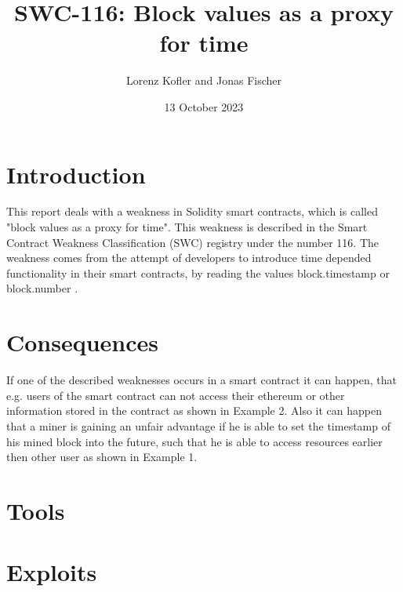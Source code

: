 \documentclass{article}
\title{SWC-116: Block values as a proxy for time}
\author{Lorenz Kofler and Jonas Fischer}
\date{13 October 2023}
\begin{document}
\maketitle
\tableofcontents
\newpage

\section{Introduction}
This report deals with a weakness in Solidity smart contracts, which is called
"block values as a proxy for time". This weakness is described in the Smart
Contract Weakness Classification (SWC) registry under the number 116. \newline
The weakness comes from the attempt of developers to introduce time depended
functionality in their smart contracts, by reading the values block.timestamp
or block.number \cite{swc116}. \newline



% 

\section{Consequences}
If one of the described weaknesses occurs in a smart contract it can happen, that e.g. users of the smart contract can not access
their ethereum or other information stored in the contract as shown in Example 2. \newline
Also it can happen that a miner is gaining an unfair advantage if he is able to set the timestamp of his mined block into the future,
such that he is able to access resources earlier then other user as shown in Example 1.

\section{Tools}
\section{Exploits}


\end{document}
